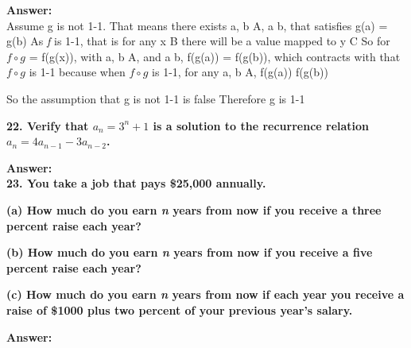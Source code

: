 \documentclass{article}
\begin{document}
\begin{large}
\textbf{Answer:} \\

Assume g is not 1-1. That means there exists a, b \in A, a \neq b, that satisfies g(a) = g(b)
As \emph{f} is 1-1, that is for any x \in B there will be a value mapped to y \in C
So for $f\circ g$ = f(g(x)), with a, b \in A, and a \neq b, f(g(a)) = f(g(b)), which contracts with that $f\circ g$ is 1-1
because when $f\circ g$ is 1-1, for any a, b \in A, f(g(a)) \neq f(g(b))

So the assumption that g is not 1-1 is false
Therefore g is 1-1

\textbf{22. Verify that $a_{n}={3^{n}+1}$ is a solution to the recurrence relation $a_{n}=4a_{n-1}-3a_{n-2}$.}

\textbf{Answer:} \\


\textbf{23. You take a job that pays \$25,000 annually.}

\textbf{(a) How much do you earn \emph{n} years from now if you receive a three percent raise each year?}

\textbf{(b) How much do you earn \emph{n} years from now if you receive a five percent raise each year? }

\textbf{(c) How much do you earn \emph{n} years from now if each year you receive a raise of \$1000 plus two percent of your previous year's salary.}

\textbf{Answer:} \\





\end{large}
\end{document}

